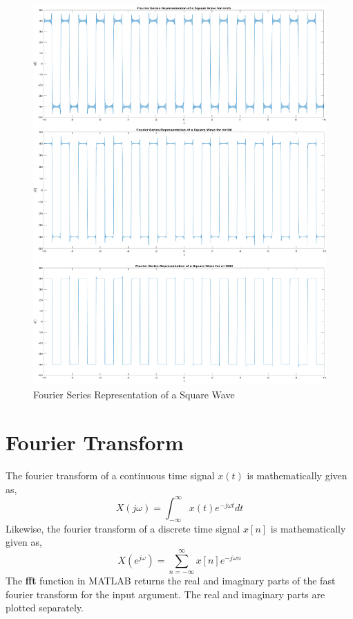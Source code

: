 \documentclass{article}
\begin{document}

\begin{figure}[H]
    \centering
    \includegraphics[scale=0.83,cframe=blue 0.5pt 3pt]{./FIG/FouSer.pdf}
    \caption{Fourier Series Representation of a Square Wave}
\end{figure}



\section{Fourier Transform}
The fourier transform of a continuous time signal $x(t)$ is mathematically given as,
$$
    X(j\omega) = \int_{-\infty}^{\infty} x(t) e^{-j\omega t} dt
$$
Likewise, the fourier transform of a discrete time signal $x[n]$ is mathematically given as,
$$
    X(e^{j\omega})=\sum_{n=-\infty}^{\infty} x[n] e^{-j\omega n}
$$
The \textbf{fft} function in MATLAB returns the real and imaginary parts of the fast fourier transform for the input argument. The real and imaginary parts are plotted separately.
\end{document}
